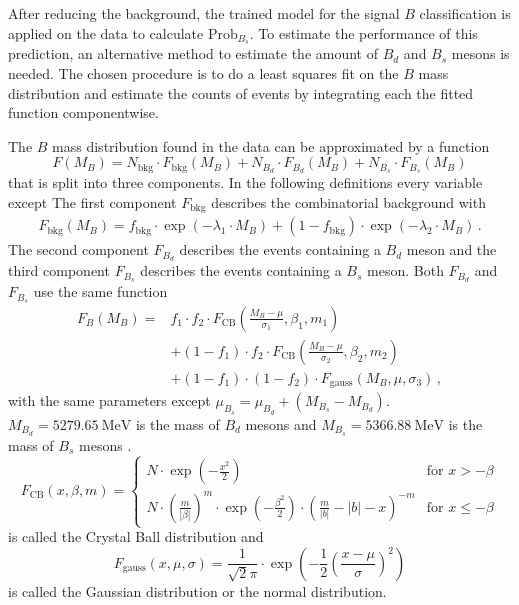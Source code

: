 After reducing the background, the trained model for the signal $B$ classification is applied on the data to calculate $\text{Prob}_{B_s}$.
To estimate the performance of this prediction, an alternative method to estimate the amount of $B_d$ and $B_s$ mesons is needed.
The chosen procedure is to do a least squares fit on the $B$ mass distribution and estimate the counts of events by integrating each the fitted function componentwise.

The $B$ mass distribution found in the data can be approximated by a function
\begin{equation*}
    F(M_B) = N_\text{bkg} \cdot F_\text{bkg}(M_B) + N_{B_d} \cdot F_{B_d}(M_B) + N_{B_s} \cdot F_{B_s}(M_B)
\end{equation*}
that is split into three components.
In the following definitions every variable except 
The first component $F_\text{bkg}$ describes the combinatorial background with 
\begin{align*}
    F_\text{bkg}(M_B) = f_\text{bkg} \cdot \exp(-\lambda_1 \cdot M_B) + (1-f_\text{bkg}) \cdot \exp(-\lambda_2 \cdot M_B) \, .
\end{align*}
The second component $F_{B_d}$ describes the events containing a $B_d$ meson and the third component $F_{B_s}$ describes the events containing a $B_s$ meson.
Both $F_{B_d}$ and $F_{B_s}$ use the same function
\begin{align*}
    F_B(M_B) = &f_1 \cdot f_2 \cdot F_\text{CB}\left(\frac{M_B-\mu}{\sigma_1}, \beta_1, m_1\right) \\
                    &+ (1-f_1) \cdot f_2 \cdot F_\text{CB}\left(\frac{M_B-\mu}{\sigma_2}, \beta_2, m_2\right) \\
                    &+ (1-f_1) \cdot (1-f_2) \cdot F_\text{gauss}\left(M_B,\mu,\sigma_3\right) \, ,
\end{align*}
with the same parameters except $\mu_{B_s} = \mu_{B_d} + (M_{B_s}-M_{B_d})$.
$M_{B_d}=\qty{5279.65}{\MeV}$ is the mass of $B_d$ mesons and $M_{B_s}=\qty{5366.88}{\MeV}$ is the mass of $B_s$ mesons \cite{pdg}.
\begin{equation*}
    F_\text{CB}(x,\beta,m) = 
     \begin{cases}
         N \cdot \exp(-\frac{x^2}{2}) & \text{for } x > -\beta \\
         N \cdot \left(\frac{m}{|\beta|}\right)^m \cdot \exp\left(-\frac{\beta^2}{2}\right) \cdot \left(\frac{m}{|b|}-|b| - x\right)^{-m} & \text{for } x \leq -\beta
     \end{cases}
\end{equation*}
is called the Crystal Ball distribution and
\begin{equation*}
    F_\text{gauss}\left(x,\mu,\sigma\right) = \frac{1}{\sqrt{2}\pi} \cdot \exp\left(-\frac{1}{2}\left(\frac{x-\mu}{\sigma}\right)^2\right)
\end{equation*}
is called the Gaussian distribution or the normal distribution.

